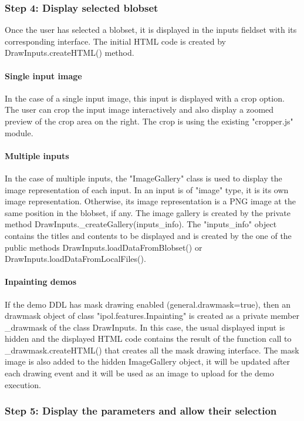 \subsubsection{Step 4: Display selected blobset}
Once the user has selected a blobset, it is displayed in the inputs fieldset
with its corresponding interface.
The initial HTML code is created by DrawInputs.createHTML() method. 

\paragraph{Single input image}
In the case of a single input image, this input is displayed with a crop option.
The user can crop the input image interactively and also display a zoomed preview
of the crop area on the right. The crop is using the existing "cropper.js" module.

\paragraph{Multiple inputs}
In the case of multiple inputs, the "ImageGallery" class is used to display the 
image representation of each input. In an input is of "image" type, it is its own
image representation. Otherwise, its image representation is a PNG image at the same
position in the blobset, if any.
The image gallery is created by the private method DrawInputs.\_createGallery(inputs\_info).
The "inputs\_info" object contains the titles and contents to be displayed and is created
by the one of the public methods DrawInputs.loadDataFromBlobset() or DrawInputs.loadDataFromLocalFiles().

\paragraph{Inpainting demos}
If the demo DDL has mask drawing enabled (general.drawmask=true), then an drawmask object
of class "ipol.features.Inpainting" is created as a private member \_drawmask of the class
DrawInputs. In this case, the usual displayed input is hidden and the displayed HTML code
contains the result of the function call to \_drawmask.createHTML() that creates all 
the mask drawing interface. The mask image is also added to the hidden ImageGallery object,
it will be updated after each drawing event and it will be used as an image to upload
for the demo execution.

\subsubsection{Step 5: Display the parameters and allow their selection}

